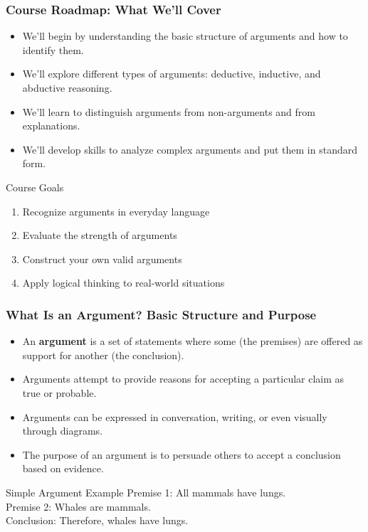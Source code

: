 \documentclass{beamer}
\begin{document}
\begin{frame}
    \frametitle{Course Roadmap: What We'll Cover}
    \begin{itemize}
        \item We'll begin by understanding the basic structure of arguments and how to identify them.
        \item We'll explore different types of arguments: deductive, inductive, and abductive reasoning.
        \item We'll learn to distinguish arguments from non-arguments and from explanations.
        \item We'll develop skills to analyze complex arguments and put them in standard form.
    \end{itemize}
    
    \begin{block}{Course Goals}
        \begin{enumerate}
            \item Recognize arguments in everyday language
            \item Evaluate the strength of arguments
            \item Construct your own valid arguments
            \item Apply logical thinking to real-world situations
        \end{enumerate}
    \end{block}
\end{frame}

\begin{frame}
    \frametitle{What Is an Argument? Basic Structure and Purpose}
    \begin{itemize}
        \item An \textbf{argument} is a set of statements where some (the premises) are offered as support for another (the conclusion).
        \item Arguments attempt to provide reasons for accepting a particular claim as true or probable.
        \item Arguments can be expressed in conversation, writing, or even visually through diagrams.
        \item The purpose of an argument is to persuade others to accept a conclusion based on evidence.
    \end{itemize}
    
    \begin{exampleblock}{Simple Argument Example}
        Premise 1: All mammals have lungs.\\
        Premise 2: Whales are mammals.\\
        Conclusion: Therefore, whales have lungs.
    \end{exampleblock}
\end{frame}
\end{document}
